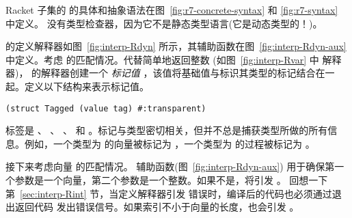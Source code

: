 \documentclass[11pt]{book}
\begin{document}
Racket 子集的 \LangDyn{} 的具体和抽象语法在图~\ref{fig:r7-concrete-syntax} 和
\ref{fig:r7-syntax} 中定义。
%
 \LangDyn{} 没有类型检查器，因为它不是静态类型语言(它是动态类型的！)。

 \LangDyn{} 的定义解释器如图~\ref{fig:interp-Rdyn} 所示，其辅助函数在图~\ref{fig:interp-Rdyn-aux} 中定义。考虑  的匹配情况。代替简单地返回整数  (如图~\ref{fig:interp-Rvar} 中 \LangVar{} 解释器)，  \LangDyn{} 的解释器创建一个 \emph{标记值} ，该值将基础值与标识其类型的标记结合在一起。定义以下结构来表示标记值。
\begin{lstlisting}
(struct Tagged (value tag) #:transparent)
\end{lstlisting}
标签是  、  、  、
 和  。标记与类型密切相关，但并不总是捕获类型所做的所有信息。例如，一个类型为  的向量被标记为
 ，一个类型为 
的过程被标记为  。

接下来考虑向量  的匹配情况。
 辅助函数(图~\ref{fig:interp-Rdyn-aux})
用于确保第一个参数是一个向量，第二个参数是一个整数。如果不是，将引发  。
回想一下第~\ref{sec:interp-Rint} 节，当定义解释器引发  错误时，编译后的代码也必须通过退出返回代码  发出错误信号。如果索引不小于向量的长度，也会引发 。
\end{document}
